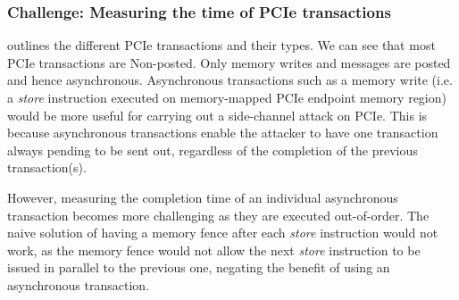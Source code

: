 \subsubsection{Challenge: Measuring the time of PCIe transactions}

 outlines the different PCIe transactions and their types.
We can see that most PCIe transactions are Non-posted.
Only memory writes and messages are posted and hence asynchronous.
Asynchronous transactions such as a memory write (i.e. a \textit{store} instruction executed on memory-mapped PCIe endpoint memory region) would be more useful for carrying out a side-channel attack on PCIe.
This is because asynchronous transactions enable the attacker to have one transaction always pending to be sent out, regardless of the completion of the previous transaction(s).

However, measuring the completion time of an individual asynchronous transaction becomes more challenging as they are executed out-of-order. 
The naive solution of having a memory fence after each \textit{store} instruction would not work, as the memory fence would not allow the next \textit{store} instruction to be issued in parallel to the previous one, negating the benefit of using an asynchronous transaction.

\endinput

https://www.linkedin.com/pulse/pci-express-primer-3-transaction-layer-simon-southwell/
